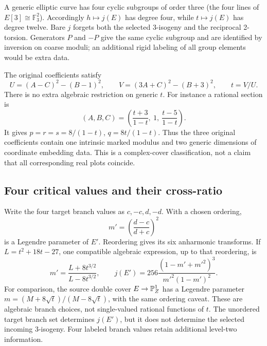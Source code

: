 A generic elliptic curve has four cyclic subgroups of order three (the four lines of \(E[3]\cong\mathbb F_3^2\)). Accordingly \(h\mapsto j(E)\) has degree four, while \(t\mapsto j(E)\) has degree twelve. Bare \(j\) forgets both the selected 3-isogeny and the reciprocal 2-torsion. Generators \(P\) and \(-P\) give the same cyclic subgroup and are identified by inversion on coarse moduli; an additional rigid labeling of all group elements would be extra data.

The original coefficients satisfy
\begin{equation}\label{eq:ABC_modulus}
 U=(A-C)^2-(B-1)^2,\qquad V=(3A+C)^2-(B+3)^2,
 \qquad t=V/U.
\end{equation}
There is no extra algebraic restriction on generic \(t\). For instance a rational section is
\begin{equation}\label{eq:section}
 (A,B,C)=\left(\frac{t+3}{1-t},\ 1,\ \frac{t-5}{1-t}\right).
\end{equation}
It gives \(p=r=s=8/(1-t)\), \(q=8t/(1-t)\). Thus the three original coefficients contain one intrinsic marked modulus and two generic dimensions of coordinate embedding data. This is a complex-cover classification, not a claim that all corresponding real plots coincide.


\subsection{Four critical values and their cross-ratio}
Write the four target branch values as \(c,-c,d,-d\). With a chosen ordering,
\begin{equation}\label{eq:crossratio}
 m'=\left(\frac{d-c}{d+c}\right)^2
\end{equation}
is a Legendre parameter of \(E'\). Reordering gives its six anharmonic transforms. If \(L=t^2+18t-27\), one compatible algebraic expression, up to that reordering, is
\begin{equation}\label{eq:crossratio_t}
 m'=\frac{L+8t^{3/2}}{L-8t^{3/2}},\qquad
 j(E')=256\frac{(1-m'+m'^2)^3}{m'^2(1-m')^2}.
\end{equation}
For comparison, the source double cover \(E\to\mathbb P^1_Z\) has a Legendre parameter
\(m=(M+8\sqrt t)/(M-8\sqrt t)\), with the same ordering caveat. These are algebraic branch choices, not single-valued rational functions of \(t\). The unordered target branch set determines \(j(E')\), but it does not determine the selected incoming 3-isogeny. Four labeled branch values retain additional level-two information.
